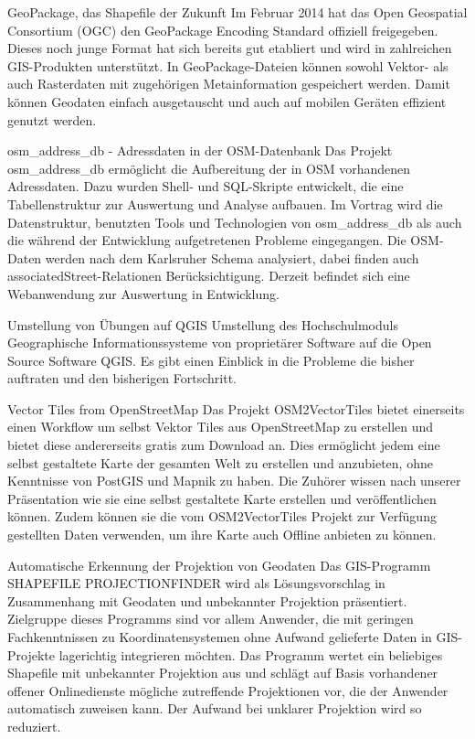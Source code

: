 \renewcommand{\konferenztag}{\dienstag}
%
{GeoPackage, das Shapefile der Zukunft}%
{}%
{Im Februar 2014 hat das Open Geospatial Consortium (OGC) den GeoPackage Encoding Standard offiziell
freigegeben. Dieses noch junge Format hat sich bereits gut etabliert und wird in zahlreichen GIS-Produkten unterstützt.
In GeoPackage-Dateien können sowohl Vektor- als auch Rasterdaten mit zugehörigen Metainformation gespeichert
werden. Damit können Geodaten einfach ausgetauscht und auch auf mobilen Geräten effizient genutzt werden.}

%
{osm\_address\_db - Adressdaten in der OSM-Datenbank}%
{}%
{Das Projekt osm\_address\_db ermöglicht die Aufbereitung der in OSM vorhandenen Adressdaten. Dazu wurden Shell-
und SQL-Skripte entwickelt, die eine Tabellenstruktur zur Auswertung und Analyse aufbauen.
Im Vortrag wird die Datenstruktur, benutzten Tools und Technologien von osm\_address\_db als auch die während der
Entwicklung aufgetretenen Probleme eingegangen. Die OSM-Daten werden nach dem Karlsruher Schema analysiert,
dabei finden auch associatedStreet-Relationen Berücksichtigung.
Derzeit befindet sich eine Webanwendung zur Auswertung in Entwicklung.}

%
{Umstellung von Übungen auf QGIS}%
{}%
{Umstellung des Hochschulmoduls Geographische Informationssysteme von proprietärer Software auf die Open Source Software QGIS. Es gibt einen Einblick in die Probleme die bisher auftraten und den bisherigen Fortschritt. }

%
{Vector Tiles from OpenStreetMap}%
{}%
{Das Projekt OSM2VectorTiles bietet einerseits einen Workflow um selbst Vektor Tiles aus OpenStreetMap zu erstellen und bietet diese andererseits gratis zum Download an. Dies ermöglicht jedem eine selbst gestaltete Karte der gesamten Welt zu erstellen und anzubieten, ohne Kenntnisse von PostGIS und Mapnik zu haben.
Die Zuhörer wissen nach unserer Präsentation wie sie eine selbst gestaltete Karte erstellen und veröffentlichen können. Zudem können sie die vom OSM2VectorTiles Projekt zur Verfügung gestellten Daten verwenden, um ihre Karte auch Offline anbieten zu können.}


%
{Automatische Erkennung der Projektion von Geodaten}%
{}%
{Das GIS-Programm SHAPEFILE PROJECTIONFINDER wird als  Lösungsvorschlag in Zusammenhang mit Geodaten und
unbekannter Projektion präsentiert. Zielgruppe dieses Programms sind vor allem Anwender, die mit geringen
Fachkenntnissen zu Koordinatensystemen ohne Aufwand gelieferte Daten in GIS-Projekte lagerichtig integrieren möchten.
Das Programm wertet ein beliebiges Shapefile mit unbekannter Projektion aus und schlägt auf Basis vorhandener offener
Onlinedienste mögliche zutreffende Projektionen vor, die der Anwender automatisch zuweisen kann. Der Aufwand bei unklarer
Projektion wird so reduziert.}

